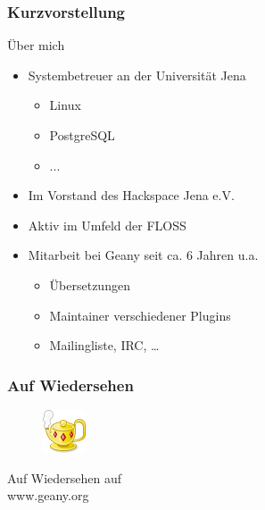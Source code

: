 
%

\frame{\titlepage}
\frame{\tableofcontents}
\begin{frame}
	\frametitle{Kurzvorstellung}
	\begin{block}{Über mich}
		\begin{itemize}
			\item Systembetreuer an der Universität Jena 
				\begin{itemize}
					\item Linux
					\item PostgreSQL
					\item ...
				\end{itemize}
			\item Im Vorstand des Hackspace Jena e.V.
			\item Aktiv im Umfeld der FLOSS
			\item Mitarbeit bei Geany seit ca. 6 Jahren u.a. 
			\begin{itemize}
				\item Übersetzungen
				\item Maintainer verschiedener Plugins
				\item Mailingliste, IRC, \dots
			\end{itemize}
		\end{itemize}
	\end{block}
\end{frame}



%
%





\begin{frame}[plain]
	\frametitle{Auf Wiedersehen}
	\begin{figure}[ht]
		\includegraphics{../img/geany.png}
	\end{figure}

	\begin{center}
	\huge Auf Wiedersehen auf \\ www.geany.org
	\end{center}
\end{frame}


